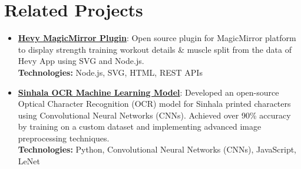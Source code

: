 \documentclass[letterpaper,11pt]{article}
\makeatletter
\newcommand{\resumeItem}[2]{
  \item\small{
    \textbf{#1}{: #2 \vspace{1pt}}
  }
}
\newcommand{\resumeSubheadingWoItalic}[4]{
  \vspace{-1pt}\item
    \begin{tabular*}{0.97\textwidth}{l@{\extracolsep{\fill}}r}
      \textbf{#1} & #2 \\
      {\footnotesize #3} & \textit{\small #4} \\
    \end{tabular*}\vspace{-5pt}
}
\newcommand{\resumeSubItem}[2]{\resumeItem{#1}{#2}\vspace{-4pt}}
\newcommand{\resumeSubHeadingListStart}{\begin{itemize}[leftmargin=*]}
\newcommand{\resumeSubHeadingListEnd}{\end{itemize}}
\makeatother
\begin{document}
\section{Related Projects}
  \resumeSubHeadingListStart
      \resumeSubItem{\href{https://github.com/wathmal/MMM-Hevy}{Hevy MagicMirror Plugin}}
      {Open source plugin for MagicMirror platform to display strength training workout details \& muscle split from the data of Hevy App using SVG and Node.js.\\
      \textbf{Technologies:} Node.js, SVG, HTML, REST APIs}
    \resumeSubItem{\href{https://github.com/wathmal/sinhala-ocr}{Sinhala OCR Machine Learning Model}}
      {Developed an open-source Optical Character Recognition (OCR) model for Sinhala printed characters using Convolutional Neural Networks (CNNs). Achieved over 90\% accuracy by training on a custom dataset and implementing advanced image preprocessing techniques. \\ 
      \textbf{Technologies:} Python, Convolutional Neural Networks (CNNs), JavaScript, LeNet}

  \resumeSubHeadingListEnd

%



\end{document}
